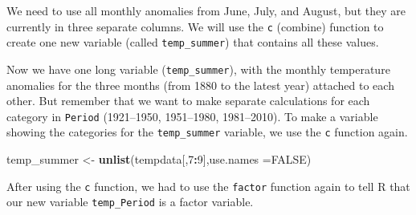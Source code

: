\documentclass[
]{article}
\newenvironment{Shaded}{\begin{snugshade}}{\end{snugshade}}
\newcommand{\AttributeTok}[1]{\textcolor[rgb]{0.13,0.29,0.53}{#1}}
\newcommand{\CommentTok}[1]{\textcolor[rgb]{0.56,0.35,0.01}{\textit{#1}}}
\newcommand{\ConstantTok}[1]{\textcolor[rgb]{0.56,0.35,0.01}{#1}}
\newcommand{\DecValTok}[1]{\textcolor[rgb]{0.00,0.00,0.81}{#1}}
\newcommand{\FunctionTok}[1]{\textcolor[rgb]{0.13,0.29,0.53}{\textbf{#1}}}
\newcommand{\NormalTok}[1]{#1}
\newcommand{\OtherTok}[1]{\textcolor[rgb]{0.56,0.35,0.01}{#1}}
\newcommand{\SpecialCharTok}[1]{\textcolor[rgb]{0.81,0.36,0.00}{\textbf{#1}}}
\begin{document}
We need to use all monthly anomalies from June, July, and August, but
they are currently in three separate columns. We will use the \texttt{c}
(combine) function to create one new variable (called
\texttt{temp\_summer}) that contains all these values.

\begin{Shaded}
\end{Shaded}

Now we have one long variable (\texttt{temp\_summer}), with the monthly
temperature anomalies for the three months (from 1880 to the latest
year) attached to each other. But remember that we want to make separate
calculations for each category in \texttt{Period} (1921--1950,
1951--1980, 1981--2010). To make a variable showing the categories for
the \texttt{temp\_summer} variable, we use the \texttt{c} function
again.

\begin{Shaded}
\begin{Highlighting}[]
\NormalTok{temp\_summer }\OtherTok{\textless{}{-}} \FunctionTok{unlist}\NormalTok{(tempdata[,}\DecValTok{7}\SpecialCharTok{:}\DecValTok{9}\NormalTok{],}\AttributeTok{use.names =}\ConstantTok{FALSE}\NormalTok{)}
\end{Highlighting}
\end{Shaded}

\begin{Shaded}
\end{Shaded}

After using the \texttt{c} function, we had to use the \texttt{factor}
function again to tell R that our new variable \texttt{temp\_Period} is
a factor variable.
\end{document}
